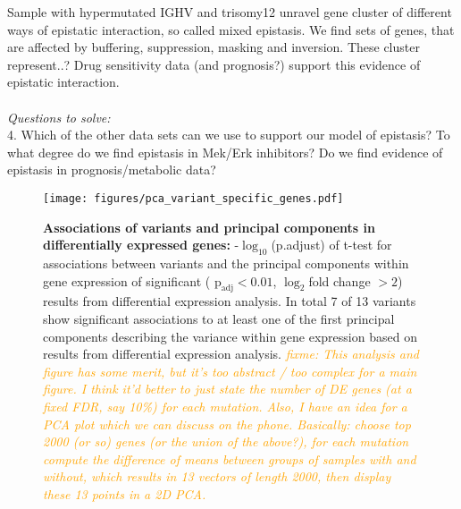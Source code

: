\documentclass[a4paper,fontsize=12pt,headsepline]{scrartcl}
\newcommand{\fixme}[1]{\textsl{\textcolor{Orange}{fixme: #1}}}
\begin{document}
     Sample with hypermutated IGHV and trisomy12 unravel gene cluster of different ways of epistatic interaction, so called mixed epistasis. We find sets of genes, that are affected by buffering, suppression, masking and inversion. These cluster represent..?  Drug sensitivity data (and prognosis?) support this evidence of epistatic interaction. \\
     \\
     \textit{Questions to solve:}\\
     4. Which of the other data sets can we use to support our model of epistasis? To what degree do we find epistasis in Mek/Erk inhibitors? Do we find evidence of epistasis in prognosis/metabolic data?
    \\
   

\begin{figure}
  \centering
  \texttt{[image: figures/pca\_variant\_specific\_genes.pdf]}
  \caption{\textbf{Associations of variants and principal components in differentially expressed genes:} -$\log_{10}$(p.adjust) of t-test for associations between variants and the principal components within gene expression of significant ( $\text{p}_\text{adj} < 0.01$, $\log_2$fold change $>2$) results from differential expression analysis. In total 7 of 13 variants show significant associations to at least one of the first principal components describing the variance within gene expression based on results from differential expression analysis. \fixme{This analysis and figure has some merit, but it's too abstract / too complex for a main figure. I think it'd better to just state the number of DE genes (at a fixed FDR, say 10\%) for each mutation. Also, I have an idea for a PCA plot which we can discuss on the phone. Basically: choose top 2000 (or so) genes (or the union of the above?), for each mutation compute the difference of means between groups of samples with and without, which results in 13 vectors of length 2000, then display these 13 points in a 2D PCA.}}
  \label{fig:distinct_genes}
\end{figure} 


\cleardoublepage

\onehalfspacing
\setcounter{page}{0}
\pagestyle{headings}
\end{document}
